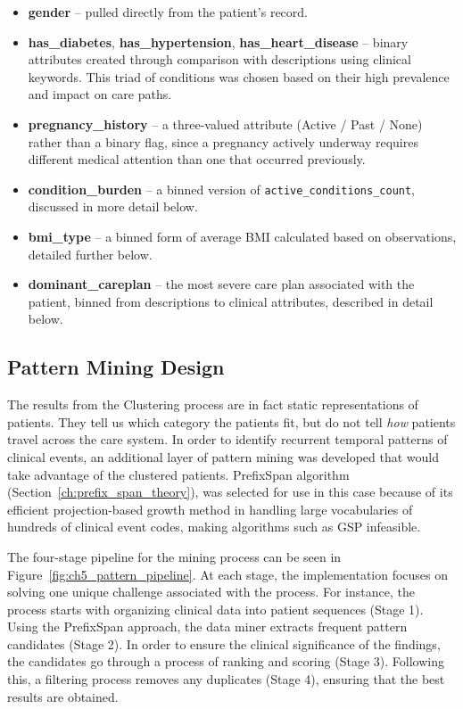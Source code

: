 \begin{itemize}

    \item \textbf{gender} -- pulled directly from the patient’s record.

    \item \textbf{has\_diabetes}, \textbf{has\_hypertension}, \textbf{has\_heart\_disease} -- binary attributes created through comparison with descriptions using clinical keywords. This triad of conditions was chosen based on their high prevalence and impact on care paths.

    \item \textbf{pregnancy\_history} -- a three-valued attribute (Active / Past / None) rather than a binary flag, since a pregnancy actively underway requires different medical attention than one that occurred previously.

    \item \textbf{condition\_burden} -- a binned version of \texttt{active\_conditions\_count}, discussed in more detail below.

    \item \textbf{bmi\_type} -- a binned form of average BMI calculated based on observations, detailed further below.

    \item \textbf{dominant\_careplan} -- the most severe care plan associated with the patient, binned from descriptions to clinical attributes, described in detail below.

\end{itemize}

\subsection{Pattern Mining Design}

The results from the Clustering process are in fact static representations of patients. They tell us which category the patients fit, but do not tell \emph{how} patients travel across the care system. In order to identify recurrent temporal patterns of clinical events, an additional layer of pattern mining was developed that would take advantage of the clustered patients. PrefixSpan algorithm (Section~\ref{ch:prefix_span_theory}), was selected for use in this case because of its efficient projection-based growth method in handling large vocabularies of hundreds of clinical event codes, making algorithms such as GSP infeasible.

The four-stage pipeline for the mining process can be seen in Figure~\ref{fig:ch5_pattern_pipeline}. At each stage, the implementation focuses on solving one unique challenge associated with the process. For instance, the process starts with organizing clinical data into patient sequences (Stage 1). Using the PrefixSpan approach, the data miner extracts frequent pattern candidates (Stage 2). In order to ensure the clinical significance of the findings, the candidates go through a process of ranking and scoring (Stage 3). Following this, a filtering process removes any duplicates (Stage 4), ensuring that the best results are obtained.

